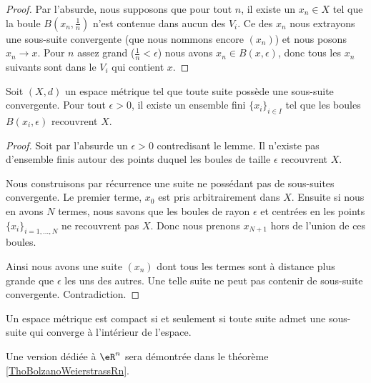 \begin{proof}
    Par l'absurde, nous supposons que pour tout \( n\), il existe un \( x_n\in X\) tel que la boule \( B(x_n,\frac{1}{ n })\) n'est contenue dans aucun des \( V_i\). Ce des \( x_n\) nous extrayons une sous-suite convergente (que nous nommons encore \( (x_n)\)) et nous posons \( x_n\to x\). Pour \( n\) assez grand (\( \frac{1}{ n }<\epsilon\)) nous avons \( x_n\in B(x,\epsilon)\), donc tous les \( x_n\) suivants sont dans le \( V_i\) qui contient \( x\).
\end{proof}

\begin{lemma}   \label{LemMGQqgDG}
    Soit \( (X,d)\) un espace métrique tel que toute suite possède une sous-suite convergente. Pour tout \( \epsilon>0\), il existe un ensemble fini \( \{ x_i \}_{i\in I}\) tel que les boules \( B(x_i,\epsilon)\) recouvrent \( X\).
\end{lemma}

\begin{proof}
    Soit par l'absurde un \( \epsilon>0\) contredisant le lemme. Il n'existe pas d'ensemble finis autour des points duquel les boules de taille \( \epsilon\) recouvrent \( X\).

    Nous construisons par récurrence une suite ne possédant pas de sous-suites convergente. Le premier terme, \( x_0\) est pris arbitrairement dans \( X\). Ensuite si nous en avons \( N\) termes, nous savons que les boules de rayon \( \epsilon\) et centrées en les points \( \{ x_i \}_{i=1,\ldots, N}\) ne recouvrent pas \( X\). Donc nous prenons \( x_{N+1}\) hors de l'union de ces boules.

    Ainsi nous avons une suite \( (x_n)\) dont tous les termes sont à distance plus grande que \( \epsilon\) les uns des autres. Une telle suite ne peut pas contenir de sous-suite convergente. Contradiction.
\end{proof}

\begin{theorem}\label{ThoBWFTXAZNH}
    Un espace métrique est compact si et seulement si toute suite admet une sous-suite qui converge à l'intérieur de l'espace.
\end{theorem}
Une version dédiée à \( \eR^n\) sera démontrée dans le théorème \ref{ThoBolzanoWeierstrassRn}.


